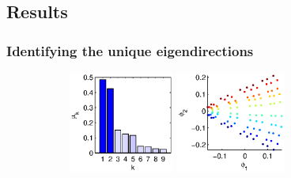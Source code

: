 \documentclass[3p]{elsarticle}
\begin{document}
\subsection{Results}

\subsubsection{Identifying the unique eigendirections}

\begin{figure}[t]
\centering
\def\figheight{1.3in}
%
\begin{subfigure}[t]{1.5in}
\centering
\includegraphics[height=\figheight]{chemotaxis1_evals}
\includegraphics[height=\figheight]{chemotaxis1_embed_good}

\end{subfigure}
\end{figure}
\end{document}
